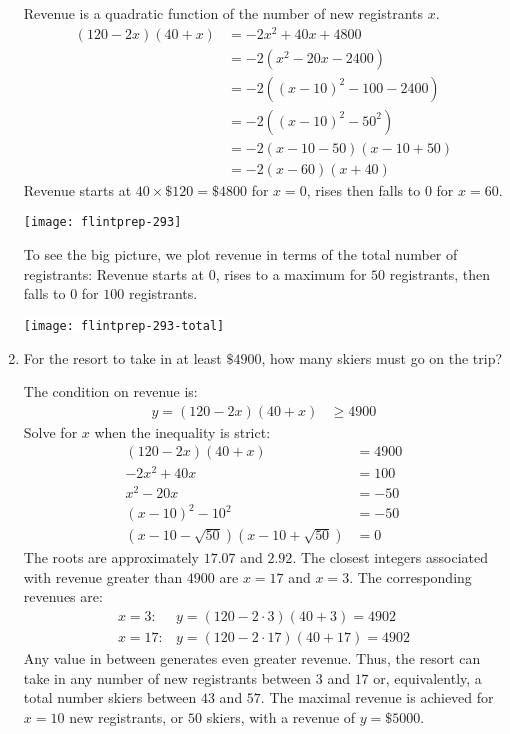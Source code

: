 \documentclass[12pt]{article}
\begin{document}
\begin{enumerate}
\begin{answer}
Revenue is a quadratic function of the number of new registrants $x$.
\begin{align*}
(120 - 2x) (40 + x) 
& = - 2x^2 + 40x + 4800 \\
& = - 2 (x^2 - 20x - 2400) \\
& = - 2 ((x - 10)^2 - 100 - 2400) \\
& = - 2 ((x - 10)^2 - 50^2) \\
& = - 2 (x - 10 - 50)(x - 10 + 50) \\
& = - 2 (x - 60)(x + 40) 
\end{align*}
Revenue starts at $40 \times \$120 = \$4800$ for $x=0$, rises then falls to $0$ for $x=60$. 

\begin{center}
  \colorbox{white}{\texttt{[image: flintprep-293]}}
\end{center}

To see the big picture, we plot revenue in terms of the total number of registrants: Revenue starts at $0$, rises to a maximum for $50$ registrants, then falls to $0$ for $100$ registrants. 
\begin{center}
  \colorbox{white}{\texttt{[image: flintprep-293-total]}}
\end{center}
\end{answer}

\item 
For the resort to take in at least $\$4900$, how many skiers must go on the trip?

\begin{answer}
The condition on revenue is:
\begin{align*}
y = (120 - 2x) (40 + x) & \geq 4900
\end{align*}
Solve for $x$ when the inequality is strict:
\begin{align*}
    (120 - 2x) (40 + x) & = 4900 \\
          -2 x^2 + 40 x & = 100 \\
             x^2 - 20 x & = -50 \\
        (x-10)^2 - 10^2 & = -50 \\
     (x-10-\sqrt{50})(x-10+\sqrt{50}) & = 0
\end{align*}
The roots are approximately $17.07$ and $2.92$. The closest integers associated with revenue greater than $4900$ are $x=17$ and $x=3$. The corresponding revenues are:
\begin{align*}
x = 3:  & y = (120 - 2 \cdot 3) (40 + 3) = 4902 \\
x = 17: & y = (120 - 2 \cdot 17) (40 + 17) = 4902
\end{align*}
Any value in between generates even greater revenue. Thus, the resort can take in any number of new registrants between $3$ and $17$ or, equivalently, a total number skiers between $43$ and $57$. The maximal revenue is achieved for $x=10$ new registrants, or $50$ skiers, with a revenue of $y=\$5000$.
\end{answer}


\end{enumerate}
\end{document}
